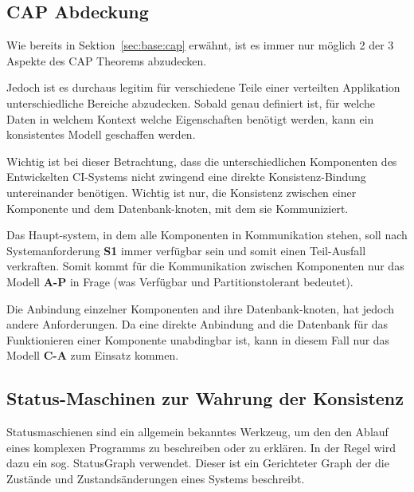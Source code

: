 

\subsection{CAP Abdeckung}

Wie bereits in Sektion~\ref{sec:base:cap} erwähnt,
ist es immer nur möglich 2 der 3 Aspekte des CAP Theorems abzudecken.

Jedoch ist es durchaus legitim für verschiedene Teile
einer verteilten Applikation unterschiedliche Bereiche abzudecken.
Sobald genau definiert ist, für welche Daten in welchem Kontext welche Eigenschaften benötigt werden,
kann ein konsistentes Modell geschaffen werden.

Wichtig ist bei dieser Betrachtung, dass die unterschiedlichen Komponenten des Entwickelten CI-Systems
nicht zwingend eine direkte Konsistenz-Bindung untereinander benötigen.
Wichtig ist nur, die Konsistenz zwischen einer Komponente
und dem Datenbank-knoten, mit dem sie Kommuniziert.

Das Haupt-system, in dem alle Komponenten in Kommunikation stehen,
soll nach Systemanforderung \textbf{S1} immer verfügbar sein und somit einen Teil-Ausfall  verkraften.
Somit kommt für die Kommunikation zwischen Komponenten nur das Modell \textbf{A-P} in Frage
(was Verfügbar und Partitionstolerant bedeutet).

Die Anbindung einzelner Komponenten and ihre Datenbank-knoten, hat jedoch andere Anforderungen.
Da eine direkte Anbindung and die Datenbank für das Funktionieren einer Komponente unabdingbar ist,
kann in diesem Fall nur das Modell \textbf{C-A} zum Einsatz kommen.




\subsection{Status-Maschinen zur Wahrung der Konsistenz}

\nocite{statechart}

Statusmaschienen sind ein allgemein bekanntes Werkzeug,
um den den Ablauf eines komplexen Programms zu beschreiben oder zu erklären.
In der Regel wird dazu ein sog. StatusGraph verwendet.
Dieser ist ein Gerichteter Graph der die Zustände und Zustandsänderungen eines Systems beschreibt.

